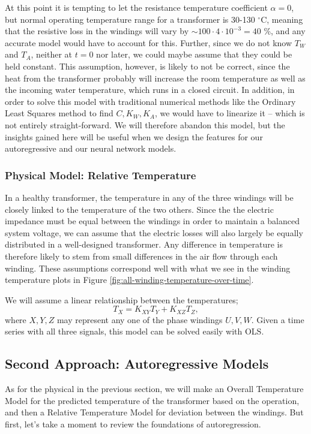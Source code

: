 \documentclass[]{article}
\begin{document}
At this point it is tempting to let the resistance temperature coefficient $\alpha = 0$, but normal operating temperature range for a transformer is 30-130 $^\circ$C, meaning that the resistive loss in the windings will vary by $\sim 100 \cdot 4 \cdot 10^{-3} = 40 $ \%, and any accurate model would have to account for this. Further, since we do not know $T_W$ and $T_A$, neither at $t = 0$ nor later, we could maybe assume that they could be held constant. This assumption, however, is likely to not be correct, since the heat from the transformer probably will increase the room temperature as well as the incoming water temperature, which runs in a closed circuit. In addition, in order to solve this model with traditional numerical methods like the Ordinary Least Squares method to find $C, K_W, K_A$, we would have to linearize it -- which is not entirely straight-forward. We will therefore abandon this model, but the insights gained here will be useful when we design the features for our autoregressive and our neural network models.

\subsubsection{Physical Model: Relative Temperature} \label{sec:physical-model-relative}
In a healthy transformer, the temperature in any of the three windings will be closely linked to the temperature of the two others. Since the the electric impedance must be equal between the windings in order to maintain a balanced system voltage, we can assume that the electric losses will also largely be equally distributed in a well-designed transformer. Any difference in temperature is therefore likely to stem from small differences in the air flow through each winding. These assumptions correspond well with what we see in the winding temperature plots in Figure \ref{fig:all-winding-temperature-over-time}.

We will assume a linear relationship between the temperatures;
\begin{equation} \label{eq:physical-relative}
	T_X = K_{XY} T_Y + K_{XZ} T_Z,
\end{equation}
where $X,Y,Z$ may represent any one of the phase windings $U,V,W$. Given a time series with all three signals, this model can be solved easily with OLS.

\subsection{Second Approach: Autoregressive Models} \label{sec:autoregressive-model}
As for the physical in the previous section, we will make an Overall Temperature Model for the predicted temperature of the transformer based on the operation, and then a Relative Temperature Model for deviation between the windings. But first, let's take a moment to review the foundations of autoregression.
\end{document}
